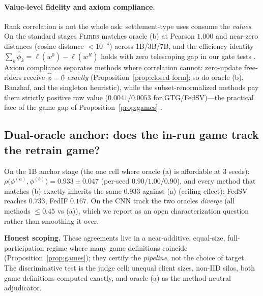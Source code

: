 \paragraph{Value-level fidelity and axiom compliance.}
Rank correlation is not the whole ask: settlement-type uses consume the
\emph{values}. On the standard stages \textsc{Flirds} matches oracle (b) at
Pearson $1.000$ and near-zero distances (cosine distance $< 10^{-4}$) across
1B/3B/7B, and the efficiency identity
$\sum_k \hat\phi_k = \ell(w^0) - \ell(w^R)$ holds with zero telescoping gap in
our gate tests . Axiom compliance separates methods where correlation
cannot: zero-update free-riders receive $\hat\phi = 0$ \emph{exactly}
(Proposition~\ref{prop:closed-form}; so do oracle (b), Banzhaf, and the
singleton heuristic), while the subset-renormalized methods pay them strictly
positive raw value ($0.0041$/$0.0053$ for GTG/FedSV)---the practical face of
the game gap of Proposition~\ref{prop:games}
.

\subsection{Dual-oracle anchor: does the in-run game track the retrain game?}
\label{sec:results-dual}

On the 1B anchor stage (the one cell where oracle (a) is affordable at 3 seeds):
$\rho\big(\phi^{(a)}, \phi^{(b)}\big) = 0.933 \pm 0.047$ (per-seed
$0.90/1.00/0.90$), and every method that matches (b) exactly inherits the same
$0.933$ against (a) (ceiling effect); FedSV reaches $0.733$, FedIF $0.167$.
On the CNN track the two oracles \emph{diverge} (all methods $\le 0.45$ vs (a)),
which we report as an open characterization question rather than smoothing it
over. 

\textbf{Honest scoping.} These agreements live in a near-additive, equal-size,
full-participation regime where many game definitions coincide
(Proposition~\ref{prop:games}); they certify the \emph{pipeline}, not the choice
of target. The discriminative test is the judge cell: unequal client sizes,
non-IID silos, both game definitions computed exactly, and oracle (a) as the
method-neutral adjudicator.  

